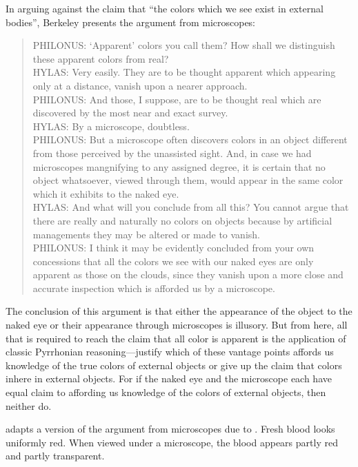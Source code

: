 \documentclass[12pt]{article}
\begin{document}
In arguing against the claim that ``the colors which we see exist in external bodies'', Berkeley presents the argument from microscopes:
\begin{quote}
	PHILONUS: `Apparent' colors you call them? How shall we distinguish these apparent colors from real?\\
	HYLAS: Very easily. They are to be thought apparent which appearing only at a distance, vanish upon a nearer approach.\\
	PHILONUS: And those, I suppose, are to be thought real which are discovered by the most near and exact survey.\\
	HYLAS: By a microscope, doubtless.\\
	PHILONUS: But a microscope often discovers colors in an object different from those perceived by the unassisted sight. And, in case we had microscopes mangnifying to any assigned degree, it is certain that no object whatsoever, viewed through them, would appear in the same color which it exhibits to the naked eye.\\
	HYLAS: And what will you conclude from all this? You cannot argue that there are really and naturally no colors on objects because by artificial managements they may be altered or made to vanish.\\
	PHILONUS: I think it may be evidently concluded from your own concessions that all the colors we see with our naked eyes are only apparent as those on the clouds, since they vanish upon a more close and accurate inspection which is afforded us by a microscope.
\end{quote}
The conclusion of this argument is that either the appearance of the object to the naked eye or their appearance through microscopes is illusory. But from here, all that is required to reach the claim that all color is apparent is the application of classic Pyrrhonian reasoning---justify which of these vantage points affords us knowledge of the true colors of external objects or give up the claim that colors inhere in external objects. For if the naked eye and the microscope each have equal claim to affording us knowledge of the colors of external objects, then neither do.

\citet{Hilbert:1987jq} adapts a version of the argument from microscopes due to \citet{Marc-Wogau:1968kx}. Fresh blood looks uniformly red. When viewed under a microscope, the blood appears partly red and partly transparent. 



 
 
\end{document}
